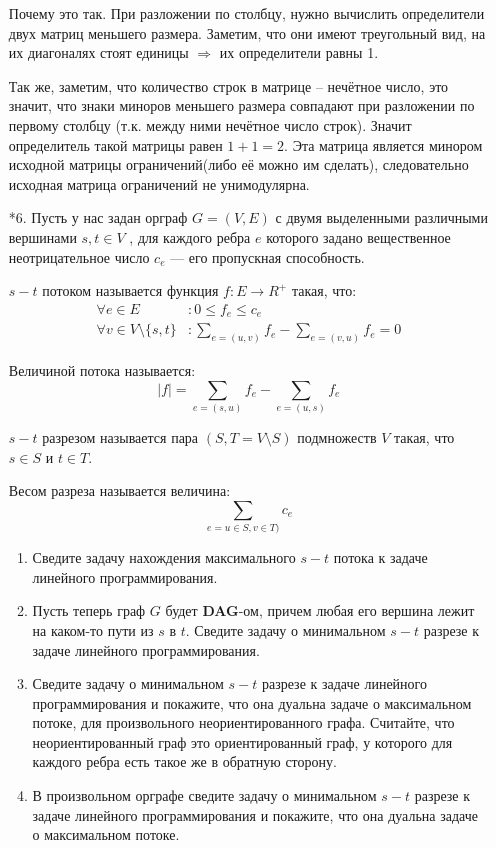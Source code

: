 \begin{enumerate}
	Почему это так. При разложении по столбцу, нужно вычислить определители двух матриц меньшего размера. 
	Заметим, что они имеют треугольный вид, на их диагоналях стоят единицы $\Rightarrow$ их определители равны 1.
	
	Так же, заметим, что количество строк в матрице -- нечётное число, это значит, что знаки миноров меньшего 
	размера совпадают при разложении по первому столбцу (т.к. между ними нечётное число строк). Значит 
	определитель такой матрицы равен $1 + 1 = 2$. Эта матрица является минором исходной матрицы ограничений(либо 
	её можно им сделать), следовательно исходная матрица ограничений не унимодулярна.
	
	\item[*6.] Пусть у нас задан орграф $G = (V, E)$ с двумя выделенными различными вершинами $s, t \in V$ , для 
	каждого ребра $e$ которого задано вещественное неотрицательное число $c_e$ — его пропускная способность.
	
	$s-t$ потоком называется функция $f : E \to R^+$ такая, что:
	\begin{align*}
		\forall e \in E&: 0 \leqslant f_e \leqslant c_e \\
		\forall v \in V \setminus \{s, t\} &: \sum\limits_{e = (u,v)} f_e - \sum\limits_{e = (v,u)} f_e = 0
	\end{align*}
	
	Величиной потока называется:
	\begin{equation*}
		|f| = \sum\limits_{e = (s, u)} f_e - \sum\limits_{e = (u, s)} f_e
	\end{equation*}
	
	$s-t$ разрезом называется пара $(S, T = V \setminus S)$ подмножеств $V$ такая, что $s \in S$ и $t \in T$. 
	
	Весом разреза называется величина:
	\begin{equation*}
		\sum\limits_{e = u\in S, v\in T)} c_e
	\end{equation*}
	
	\begin{enumerate}
		\item Сведите задачу нахождения максимального $s-t$ потока к задаче линейного программирования.
		\item Пусть теперь граф $G$ будет \textbf{DAG}-ом, причем любая его вершина лежит на каком-то пути из $s$ 
		в $t$. Сведите задачу о минимальном $s-t$ разрезе к задаче линейного программирования.
		\item Сведите задачу о минимальном $s-t$ разрезе к задаче линейного программирования и покажите, что она 
		дуальна задаче о максимальном потоке, для произвольного неориентированного графа. Считайте, что 
		неориентированный граф это ориентированный граф, у которого для каждого ребра есть такое же в обратную 
		сторону.
		\item В произвольном орграфе сведите задачу о минимальном $s-t$ разрезе к задаче линейного 
		программирования и покажите, что она дуальна задаче о максимальном потоке.
	\end{enumerate}
\end{enumerate}

